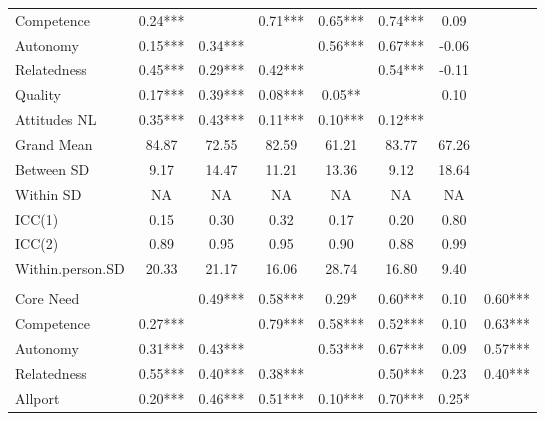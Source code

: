 \begin{table}
\begin{minipage}[t][\textheight][t]{\textwidth}
{\begin{tabular}[t]{lccccccc}
\hspace{1em}Competence & 0.24*** &  & 0.71*** & 0.65*** & 0.74*** & 0.09 & \\
\hspace{1em}Autonomy & 0.15*** & 0.34*** &  & 0.56*** & 0.67*** & -0.06 & \\
\hspace{1em}Relatedness & 0.45*** & 0.29*** & 0.42*** &  & 0.54*** & -0.11 & \\
\hspace{1em}Quality & 0.17*** & 0.39*** & 0.08*** & 0.05** &  & 0.10 & \\
\hspace{1em}Attitudes NL & 0.35*** & 0.43*** & 0.11*** & 0.10*** & 0.12*** &  & \\
\addlinespace
\hspace{1em}Grand Mean & 84.87 & 72.55 & 82.59 & 61.21 & 83.77 & 67.26 & \\
\hspace{1em}Between SD & 9.17 & 14.47 & 11.21 & 13.36 & 9.12 & 18.64 & \\
\hspace{1em}Within SD & NA & NA & NA & NA & NA & NA & \\
\hspace{1em}ICC(1) & 0.15 & 0.30 & 0.32 & 0.17 & 0.20 & 0.80 & \\
\hspace{1em}ICC(2) & 0.89 & 0.95 & 0.95 & 0.90 & 0.88 & 0.99 & \\
\hspace{1em}Within.person.SD & 20.33 & 21.17 & 16.06 & 28.74 & 16.80 & 9.40 & \\
\addlinespace[0.3em]
\multicolumn{8}{l}{\textbf{Study 3}}\\
\hspace{1em}Core Need &  & 0.49*** & 0.58*** & 0.29* & 0.60*** & 0.10 & 0.60***\\
\hspace{1em}Competence & 0.27*** &  & 0.79*** & 0.58*** & 0.52*** & 0.10 & 0.63***\\
\hspace{1em}Autonomy & 0.31*** & 0.43*** &  & 0.53*** & 0.67*** & 0.09 & 0.57***\\
\hspace{1em}Relatedness & 0.55*** & 0.40*** & 0.38*** &  & 0.50*** & 0.23 & 0.40***\\
\hspace{1em}Allport & 0.20*** & 0.46*** & 0.51*** & 0.10*** & 0.70*** & 0.25* & \\

\end{tabular}}
\end{minipage}
\end{table}
